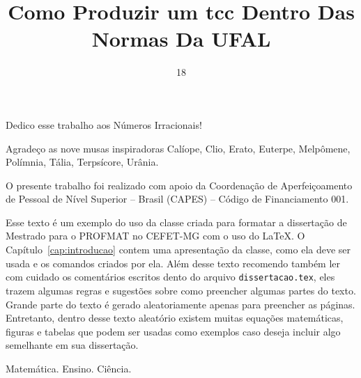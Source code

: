 \documentclass[fleqn]{profmat-cefet}
\title{Como Produzir um tcc Dentro Das Normas Da UFAL}
\date{18}{11}{2021}
\newcommand{\texfile}  {\texttt{dissertacao.tex}}
\begin{document}

\begin{dedication} 

Dedico esse trabalho aos Números Irracionais!

\end{dedication}

\begin{acknowledgement} 


\noindent
Agradeço as nove musas inspiradoras Calíope, Clio, Erato, Euterpe, Melpômene,
Polímnia, Tália, Terpsícore, Urânia.

%
%
\vspace{2\baselineskip}\noindent
O presente trabalho foi realizado com apoio da Coordenação de Aperfeiçoamento 
de Pessoal de Nível Superior -- Brasil (CAPES) -- Código de Financiamento 001.

\end{acknowledgement}

\begin{Resumo}


Esse texto é um exemplo do uso da classe criada para formatar
a dissertação de Mestrado para o PROFMAT no CEFET-MG com o uso do \LaTeX{}.
O Capítulo~\ref{cap:introducao} contem uma apresentação 
da classe, como ela deve ser usada e os comandos criados por 
ela. Além desse texto recomendo também ler com cuidado os comentários escritos
dento do arquivo \texfile{}, eles trazem algumas regras e 
sugestões sobre como preencher algumas partes do texto.
Grande parte do texto é gerado aleatoriamente apenas para preencher as páginas. 
Entretanto, dentro desse texto aleatório existem muitas equações matemáticas, 
figuras e tabelas que podem ser usadas como exemplos caso deseja incluir
algo semelhante em sua dissertação.

\PalavrasChave Matemática. Ensino. Ciência.

\end{Resumo}
\end{document}

